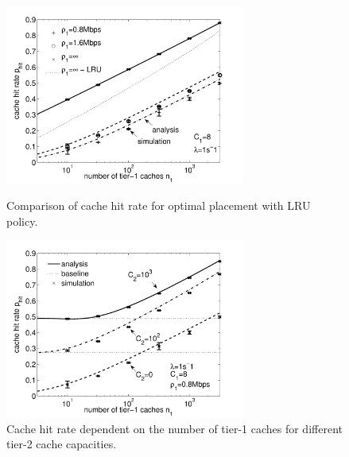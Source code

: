 \begin{figure}[!tb]
\begin{minipage}[t]{\textwidth}
  \centering
  \includegraphics[width=0.7\textwidth]{hierarchical/analyticbw/figures/hwc_CISP0}
  \caption{Comparison of cache hit rate for optimal placement with LRU policy.}
  \label{fig:hwc_CISP0}
\end{minipage}
\begin{minipage}[t]{\textwidth}
  \centering
  \includegraphics[width=0.7\textwidth]{hierarchical/analyticbw/figures/hwc_l1C8_C2}
  \caption{Cache hit rate dependent on the number of tier-1 caches for different tier-2 cache capacities.}
  \label{fig:hwc_l1C8_C2}
\end{minipage}
\end{figure}

